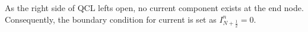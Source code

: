 \documentclass[11pt,final]{scrbook}
\begin{document}
As the right side of QCL lefts open, no current component exists at the end node. Consequently, the boundary condition for current is set as $I_{N+\frac{1}{2}}^{n}=0$.


%
%
%
\end{document}
